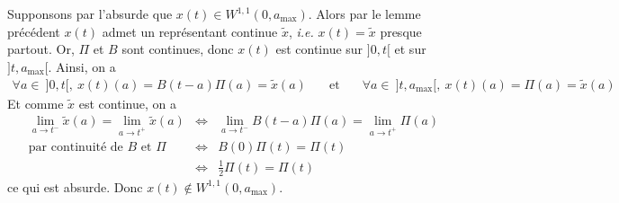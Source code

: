 Supponsons par l'absurde que $x(t) \in W^{1,1}(0,a_{\max})$. Alors par le lemme précédent $x(t)$ admet un représentant continue $\tilde{x}$, \textit{i.e.} $x(t) = \tilde{x}$ presque partout. Or, $\Pi$ et $B$ sont continues, donc $x(t)$ est continue sur $]0,t[$ et sur $]t,a_{\max}[$. Ainsi, on a 
\begin{eqnarray*}
    \forall a \in \ ]0,t[, \ x(t)(a)=B(t-a)\Pi(a)=\tilde{x}(a) \ \ \ &\text{ et }& \ \ \ \forall a \in \ ]t, a_{\max}[, \ x(t)(a)= \Pi(a) = \tilde{x}(a)
\end{eqnarray*}
Et comme $\tilde{x}$ est continue, on a 
\begin{eqnarray*}
    \lim_{a \to t^-}\tilde{x}(a) = \lim_{a \to t^+}\tilde{x}(a) &\iff& \lim_{a \to t^-} B(t-a)\Pi(a) = \lim_{a \to t^+}\Pi(a) \\
    \text{par continuité de $B$ et $\Pi$ } &\iff& B(0)\Pi(t) = \Pi(t) \\
    &\iff& \frac{1}{2}\Pi(t) = \Pi(t)
\end{eqnarray*}
ce qui est absurde. Donc $x(t) \notin W^{1,1}(0,a_{\max})$.

